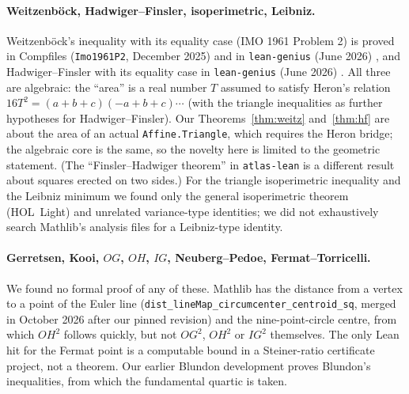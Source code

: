 \documentclass[11pt]{article}
\theoremstyle{definition}
\theoremstyle{remark}
\newcommand{\lean}[1]{\texttt{#1}}
\begin{document}
\paragraph{Weitzenb\"ock, Hadwiger--Finsler, isoperimetric, Leibniz.} Weitzenb\"ock's inequality
with its equality case (IMO 1961 Problem 2) is proved in Compfiles (\lean{Imo1961P2}, December 2025)
\cite{compfiles} and in \lean{lean-genius} (June 2026) \cite{lgweitz}, and Hadwiger--Finsler with
its equality case in \lean{lean-genius} (June 2026) \cite{lghf}. All three are algebraic: the
``area'' is a real number $T$ assumed to satisfy Heron's relation $16T^2=(a+b+c)(-a+b+c)\cdots$
(with the triangle inequalities as further hypotheses for Hadwiger--Finsler). Our
Theorems~\ref{thm:weitz} and~\ref{thm:hf} are about the area of an actual \lean{Affine.Triangle},
which requires the Heron bridge; the algebraic core is the same, so the novelty here is limited to
the geometric statement. (The ``Finsler--Hadwiger theorem'' in \lean{atlas-lean} is a different
result about squares erected on two sides.) For the triangle isoperimetric inequality and the
Leibniz minimum we found only the general isoperimetric theorem (HOL~Light) and unrelated
variance-type identities; we did not exhaustively search Mathlib's analysis files for a Leibniz-type
identity.

\paragraph{Gerretsen, Kooi, $OG$, $OH$, $IG$, Neuberg--Pedoe, Fermat--Torricelli.} We found no formal
proof of any of these. Mathlib has the distance from a vertex to a point of the Euler line
(\lean{dist\_lineMap\_circumcenter\_centroid\_sq}, merged in October 2026 after our pinned revision)
and the nine-point-circle centre, from which $OH^2$ follows quickly, but not $OG^2$, $OH^2$ or
$IG^2$ themselves. The only Lean hit for the Fermat point is a computable bound in a Steiner-ratio
certificate project, not a theorem. Our earlier Blundon development \cite{paperD} proves Blundon's
inequalities, from which the fundamental quartic is taken.
\end{document}
